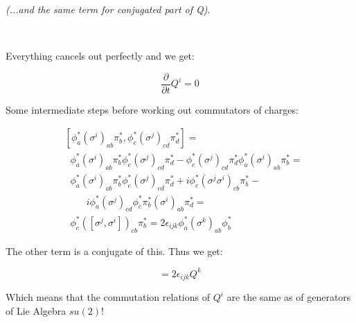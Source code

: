 \documentclass[11pt]{article}
\begin{document}
\textit{(...and the same term for conjugated part of Q)}.

\

Everything cancels out perfectly and we get:

\begin{equation}
\frac{\partial}{\partial t} Q^i = 0
\end{equation}

Some intermediate steps before working out commutators of charges:

\begin{equation}
\begin{split}
& [ \phi^*_a \left(\sigma^i\right)_{ab} \pi^*_b,
  \phi^*_c \left(\sigma^j\right)_{cd} \pi^*_d ] = \\
& \; \; \phi^*_a \left(\sigma^i\right)_{ab} \pi^*_b
    \phi^*_c \left(\sigma^j\right)_{cd} \pi^*_d -
  \phi^*_c \left(\sigma^j\right)_{cd} \pi^*_d
    \phi^*_a \left(\sigma^i\right)_{ab} \pi^*_b = \\
& \; \; \phi^*_a \left(\sigma^i\right)_{ab} \pi^*_b
    \phi^*_c \left(\sigma^j\right)_{cd} \pi^*_d +
    i \phi^*_c \left(\sigma^j \sigma^i\right)_{cb} \pi^*_b - \\
& \; \; \; \; \; \; \; \;
    i \phi^*_a \left(\sigma^j\right)_{cd} \phi^*_c \pi^*_b
      \left(\sigma^i\right)_{ab} \pi^*_d = \\
& \; \;
   \phi^*_c \left([ \sigma^j , \sigma^i ]\right)_{cb} \pi^*_b =
   2 \epsilon_{ijk} \phi^*_a \left(\sigma^k\right)_{ab} \phi^*_b
\end{split}
\end{equation}

The other term is a conjugate of this. Thus we get:

\begin{equation}
[ Q^i, Q^j] = 2 \epsilon_{ijk} Q^k
\end{equation}

Which means that the commutation relations of $Q^i$ are the same as of
generators of Lie Algebra $su(2)$!
\end{document}
